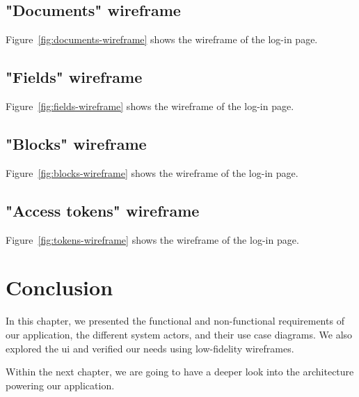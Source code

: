 \begin{toexclude}

  \subsection{"Documents" wireframe}
  Figure~\ref{fig:documents-wireframe} shows the wireframe of the log-in page.


  \subsection{"Fields" wireframe}
  Figure~\ref{fig:fields-wireframe} shows the wireframe of the log-in page.


  \subsection{"Blocks" wireframe}
  Figure~\ref{fig:blocks-wireframe} shows the wireframe of the log-in page.


  \subsection{"Access tokens" wireframe}
  Figure~\ref{fig:tokens-wireframe} shows the wireframe of the log-in page.


  \section{Conclusion}

  In this chapter, we presented the functional and non-functional requirements of our application, the different system actors, and their use case diagrams.
  We also explored the \acrlong{ui} and verified our needs using low-fidelity wireframes.

  Within the next chapter, we are going to have a deeper look into the architecture powering our application.

\end{toexclude}